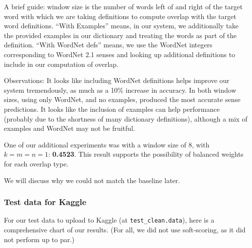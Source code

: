 \documentclass{article}
\begin{document}
A brief guide: window size is the number of words left of and right of the target word with which we are taking definitions to compute overlap with the target word definitions. ``With Examples'' means, in our system, we additionally take the provided examples in our dictionary and treating the words as part of the definition. ``With WordNet defs'' means, we use the WordNet integers corresponding to WordNet 2.1 senses and looking up additional definitions to include in our computation of overlap.

Observations: It looks like including WordNet definitions helps improve our system tremendously, as much as a 10\% increase in accuracy. In both window sizes, using only WordNet, and no examples, produced the most accurate sense predictions. It looks like the inclusion of examples can help performance (probably due to the shortness of many dictionary definitions), although a mix of examples and WordNet may not be fruitful.

One of our additional experiments was with a window size of 8, with $k = m = n = 1$: \textbf{0.4523}. This result supports the possibility of balanced weights for each overlap type.

We will discuss why we could not match the baseline later.

\subsubsection{Test data for Kaggle}
For our test data to upload to Kaggle (at \texttt{test\_clean.data}), here is a comprehensive chart of our results. (For all, we did not use soft-scoring, as it did not perform up to par.)\par
\end{document}
